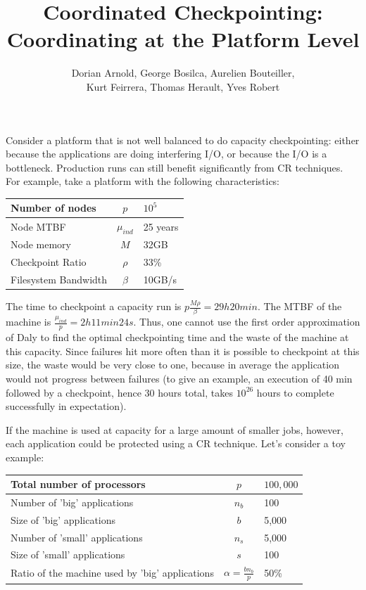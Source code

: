 \documentclass{article}
\author{Dorian Arnold, George Bosilca, Aurelien Bouteiller,\\
 Kurt Feirrera, Thomas Herault, Yves Robert}
\title{Coordinated Checkpointing: Coordinating at the Platform Level}
\begin{document}
\maketitle

Consider a platform that is not well balanced to do capacity checkpointing: either because the applications are doing interfering I/O, or because the I/O is a bottleneck. Production runs can still benefit significantly from CR techniques. For example, take a platform with the following characteristics:

\begin{center}
\begin{tabular}{l|c|l}
  Number of nodes & $p$             & $10^5$ \\\hline
  Node MTBF           & $\mu_{ind}$ & 25 years\\\hline
  Node memory      & $M$             & 32GB\\\hline
  Checkpoint Ratio & $\rho$         & 33\%\\\hline
  Filesystem Bandwidth & $\beta$ & 10GB/s\\
\end{tabular}
\end{center}

The time to checkpoint a capacity run is $p\frac{M \rho}{\beta} = 29h20min$. The MTBF of the machine is $\frac{\mu_{ind}}{p} = 2h11min24s$. Thus, one cannot use the first order approximation of Daly to find the optimal checkpointing time and the waste of the machine at this capacity. Since failures hit more often than it is possible to checkpoint at this size, the waste would be very close to one, because in average the application would not progress between failures (to give an example, an execution of 40 min
followed by a checkpoint, hence 30 hours total, takes $10^{26}$ hours to complete successfully in expectation).

If the machine is used at capacity for a large amount of smaller jobs, however, each application could be protected using a CR technique. Let's consider a toy example:

\begin{center}
\begin{tabular}{lcl}
  Total number of processors & $p$ & $100,000$\\\hline
  Number of 'big' applications & $n_{b}$ & 100\\\hline
  Size of 'big' applications & $b$ & 5,000\\\hline
  Number of 'small' applications & $n_{s}$ & 5,000\\\hline
  Size of 'small' applications & $s$ & 100\\\hline
  Ratio of the machine used by 'big' applications & $\alpha = \frac{b n_{b}}{p} $ & 50\%\\
\end{tabular}
\end{center}
\end{document}
